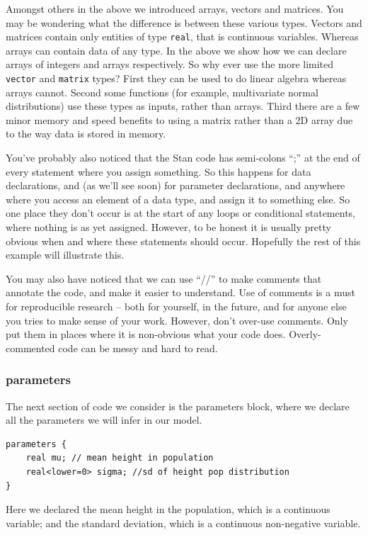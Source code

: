 \documentclass[11pt,fullpage]{book}
\begin{document}
Amongst others in the above we introduced arrays, vectors and matrices. You may be wondering what the difference is between these various types. Vectors and matrices contain only entities of type \texttt{real}, that is continuous variables. Whereas arrays can contain data of any type. In the above we show how we can declare arrays of integers and arrays respectively. So why ever use the more limited \texttt{vector} and \texttt{matrix} types? First they can be used to do linear algebra whereas arrays cannot. Second some functions (for example, multivariate normal distributions) use these types as inputs, rather than arrays. Third there are a few minor memory and speed benefits to using a matrix rather than a 2D array due to the way data is stored in memory.

You've probably also noticed that the Stan code has semi-colons ``;'' at the end of every statement where you assign something. So this happens for data declarations, and (as we'll see soon) for parameter declarations, and anywhere where you access an element of a data type, and assign it to something else. So one place they don't occur is at the start of any loops or conditional statements, where nothing is as yet assigned. However, to be honest it is usually pretty obvious when and where these statements should occur. Hopefully the rest of this example will illustrate this.

You may also have noticed that we can use ``//'' to make comments that annotate the code, and make it easier to understand. Use of comments is a must for reproducible research -- both for yourself, in the future, and for anyone else you tries to make sense of your work. However, don't over-use comments. Only put them in places where it is non-obvious what your code does. Overly-commented code can be messy and hard to read. 

\subsubsection{parameters}
The next section of code we consider is the parameters block, where we declare all the parameters we will infer in our model.
\begin{verbatim}
parameters {
    real mu; // mean height in population
    real<lower=0> sigma; //sd of height pop distribution
}
\end{verbatim}
Here we declared the mean height in the population, which is a continuous variable; and the standard deviation, which is a continuous non-negative variable. 
\end{document}
